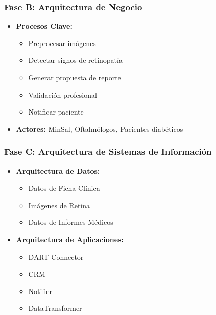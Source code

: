\subsubsection{Fase B: Arquitectura de Negocio}
\begin{itemize}
\item \textbf{Procesos Clave:}
  \begin{itemize}
    \item Preprocesar imágenes
    \item Detectar signos de retinopatía
    \item Generar propuesta de reporte
    \item Validación profesional
    \item Notificar paciente
  \end{itemize}
\item \textbf{Actores:} MinSal, Oftalmólogos, Pacientes diabéticos
\end{itemize}

\subsubsection{Fase C: Arquitectura de Sistemas de Información}
\begin{itemize}
\item \textbf{Arquitectura de Datos:}
  \begin{itemize}
    \item Datos de Ficha Clínica
    \item Imágenes de Retina
    \item Datos de Informes Médicos
  \end{itemize}
\item \textbf{Arquitectura de Aplicaciones:}
  \begin{itemize}
    \item DART Connector
    \item CRM
    \item Notifier
    \item DataTransformer
  \end{itemize}
\end{itemize}

